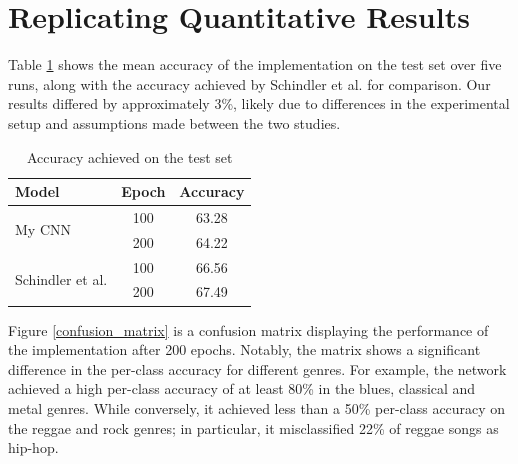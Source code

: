 \documentclass[conference]{IEEEtran}
\begin{document}
\section{Replicating Quantitative Results}

Table \ref{shallow_results} shows the mean accuracy of the implementation on the test set over five runs, along with the accuracy achieved by Schindler et al. \cite{SchindlerLidyRauber} for comparison.
Our results differed by approximately 3\%, likely due to differences in the experimental setup and assumptions made between the two studies.

\begin{table}[htbp]
    \caption{Accuracy achieved on the test set}
    \begin{center}
    \begin{tabular}{l c c}
    \toprule
    \textbf{Model}&\textbf{Epoch}&\textbf{Accuracy}\\
    \midrule
    \multirow{ 2}{*}{My CNN} & 100 & 63.28 \\
    & 200 & 64.22 \\
    \midrule
    \multirow{ 2}{*}{Schindler et al.} & 100 & 66.56\\
    & 200 & 67.49 \\
    \bottomrule
    \end{tabular}
    \label{shallow_results}
    \end{center}
\end{table}

Figure \ref{confusion_matrix} is a confusion matrix displaying the performance of the implementation after 200 epochs.
Notably, the matrix shows a significant difference in the per-class accuracy for different genres.
For example, the network achieved a high per-class accuracy of at least 80\% in the blues, classical and metal genres.
While conversely, it achieved less than a 50\% per-class accuracy on the reggae and rock genres; in particular, it misclassified 22\% of reggae songs as hip-hop.
\end{document}
